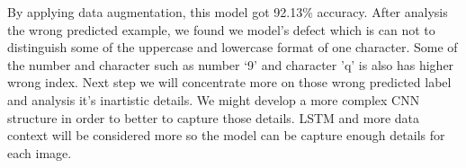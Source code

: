 \documentclass[twoside,twocolumn,10.8pt]{article}
\begin{document}
\noindent By applying data augmentation, this model got 92.13\% accuracy. After analysis the wrong predicted example, we found we model’s defect which is can not to distinguish some of the uppercase and lowercase format of one character. Some of the number and character such as number ‘9’ and character ’q’ is also has higher wrong index. Next step we will concentrate more on those wrong predicted label and analysis it’s inartistic details. We might develop a more complex CNN structure in order to better to capture those details. LSTM and more data context will be considered more so the model can be capture enough details for each image.














 

\end{document}
